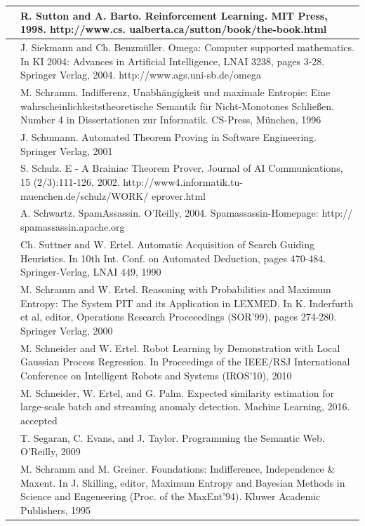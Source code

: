\documentclass[10pt]{book}
\begin{document}
\begin{center}
\begin{tabular}{|l|l|}
\hline [SB98] & R. Sutton and A. Barto. Reinforcement Learning. MIT Press, 1998. http://www.cs. ualberta.ca/sutton/book/the-book.html \\
\hline [SB04] & J. Siekmann and Ch. Benzmüller. Omega: Computer supported mathematics. In KI 2004: Advances in Artificial Intelligence, LNAI 3238, pages 3-28. Springer Verlag, 2004. http://www.ags.uni-sb.de/omega \\
\hline [Sch96] & M. Schramm. Indifferenz, Unabhängigkeit und maximale Entropie: Eine wahrscheinlichkeitstheoretische Semantik für Nicht-Monotones Schließen. Number 4 in Dissertationen zur Informatik. CS-Press, München, 1996 \\
\hline [Sch01] & J. Schumann. Automated Theorem Proving in Software Engineering. Springer Verlag, 2001 \\
\hline [Sch02] & S. Schulz. E - A Brainiac Theorem Prover. Journal of AI Communications, 15 (2/3):111-126, 2002. http://www4.informatik.tu-muenchen.de/schulz/WORK/ eprover.html \\
\hline [Sch04] & A. Schwartz. SpamAssassin. O'Reilly, 2004. Spamassassin-Homepage: http:// spamassassin.apache.org \\
\hline [SE90] & Ch. Suttner and W. Ertel. Automatic Acquisition of Search Guiding Heuristics. In 10th Int. Conf. on Automated Deduction, pages 470-484. Springer-Verlag, LNAI 449, 1990 \\
\hline [SE00] & M. Schramm and W. Ertel. Reasoning with Probabilities and Maximum Entropy: The System PIT and its Application in LEXMED. In K. Inderfurth et al, editor, Operations Research Proceeedings (SOR'99), pages 274-280. Springer Verlag, 2000 \\
\hline [SE10] & M. Schneider and W. Ertel. Robot Learning by Demonstration with Local Gaussian Process Regression. In Proceedings of the IEEE/RSJ International Conference on Intelligent Robots and Systems (IROS'10), 2010 \\
\hline [SEP16] & M. Schneider, W. Ertel, and G. Palm. Expected similarity estimation for large-scale batch and streaming anomaly detection. Machine Learning, 2016. accepted \\
\hline [SET09] & T. Segaran, C. Evans, and J. Taylor. Programming the Semantic Web. O'Reilly, 2009 \\
\hline [\cite{sg95}] & M. Schramm and M. Greiner. Foundations: Indifference, Independence \& Maxent. In J. Skilling, editor, Maximum Entropy and Bayesian Methods in Science and Engeneering (Proc. of the MaxEnt'94). Kluwer Academic Publishers, 1995 \\

\end{tabular}
\end{center}
\end{document}
